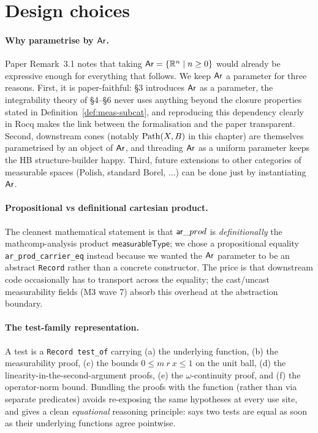 \section{Design choices}\label{sec:mcones-design}

\paragraph{Why parametrise by \texorpdfstring{$\mathsf{Ar}$}{Ar}.}
Paper Remark~3.1 notes that taking $\mathsf{Ar} = \{\mathbb{R}^n \mid n \ge 0\}$ would
already be expressive enough for everything that follows. We keep
$\mathsf{Ar}$ a parameter for three reasons. First, it is paper-faithful:
\S3 introduces $\mathsf{Ar}$ as a parameter, the integrability theory of
\S4--\S6 never uses anything beyond the closure properties stated in
Definition~\ref{def:meas-subcat}, and reproducing this dependency
clearly in Rocq makes the link between the formalisation and the
paper transparent. Second, downstream cones (notably $\mathrm{Path}(X, B)$ in
this chapter) are themselves parametrised by an object of $\mathsf{Ar}$, and
threading $\mathsf{Ar}$ as a uniform parameter keeps the HB structure-builder
happy. Third, future extensions to other categories of measurable
spaces (Polish, standard Borel, $\dots$) can be done
just by instantiating $\mathsf{Ar}$.

\paragraph{Propositional vs definitional cartesian product.}
The cleanest mathematical statement is that $\mathsf{ar}\_prod$ is
\emph{definitionally} the mathcomp-analysis product
$\mathsf{measurableType}$; we chose a propositional equality
\texttt{ar\_prod\_carrier\_eq} instead because we wanted the $\mathsf{Ar}$
parameter to be an abstract \texttt{Record} rather than a concrete
constructor. The price is that downstream code occasionally has to
transport across the equality; the cast/uncast measurability fields
(M3 wave 7) absorb this overhead at the abstraction boundary.

\paragraph{The test-family representation.}
A test is a \texttt{Record\ test\_of} carrying (a) the underlying
function, (b) the measurability proof, (c) the bounds
$0 \le m\ r\ x \le 1$ on the unit ball, (d) the
linearity-in-the-second-argument proofs, (e) the $\omega$-continuity
proof, and (f) the operator-norm bound. Bundling the proofs with the
function (rather than via separate predicates) avoids re-exposing the
same hypotheses at every use site, and gives a clean
\emph{equational} reasoning principle:
 says two tests are equal as soon
as their underlying functions agree pointwise.

